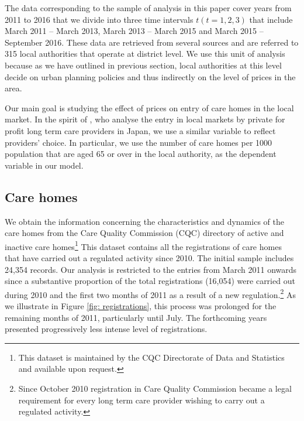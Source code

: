 \documentclass[12pt,letterpaper]{article}
\begin{document}
 
The data corresponding to  the sample of analysis in this paper cover years from 2011 to 2016 
  that we divide into three time intervals $t  (t = 1, 2, 3)$ that include March 2011 – March 2013, 
  March 2013 – March 2015 and March 2015 – September 2016. These data are 
  retrieved from several sources and are referred to 315 local authorities that operate at district level. We 
  use this unit of analysis because as we have outlined in previous section, local authorities at this 
  level decide on urban planning policies and thus indirectly on the level of prices in the area. 
 
   Our main goal is studying the effect of prices on entry of care 
   homes in the local market. In the spirit of \citet{tokunaga2013factors}, who analyse
 the entry in local markets by private for profit long term care providers in Japan, we use a similar variable to 
 reflect providers' choice. In particular, we use the number
  of care homes per 1000 population that
 are aged 65 or over in the local authority,  as the dependent variable in our model. 
 
 \subsection{Care homes} 
 
 We obtain the information concerning the characteristics and dynamics of the
care homes from the Care Quality Commission (CQC) directory of active and inactive
care homes\footnote{This dataset is maintained by the CQC Directorate of Data and Statistics and available upon request.}
This dataset contains all the registrations of care homes that have carried out a regulated activity since
   2010. The initial sample includes 24,354 records. Our analysis is restricted to the entries from March
    2011 onwards since a substantive proportion of the total registrations (16,054) were 
     carried out during 2010 and the first two months of 2011 as a result 
     of a new regulation.\footnote{Since October 2010 registration in Care Quality Commission  became a legal requirement for every long 
     term care provider wishing to carry out a regulated activity.} As we illustrate in Figure \ref{fig: registrations}, this process 
     was prolonged for the remaining months of 2011, particularly until July. The forthcoming years presented  
     progressively less intense level of registrations.
     
    {}
     
\end{document}
